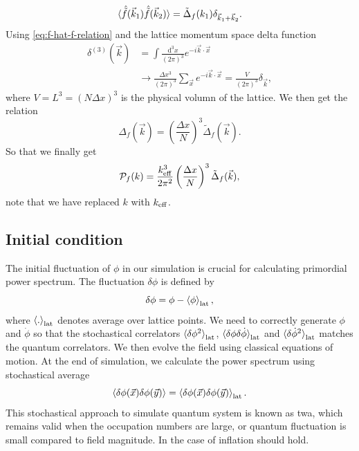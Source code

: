 \documentclass[reprint, 10pt, amsmath, amssymb, floatfix, aps, prd, superscriptaddress, nofootinbib, nobibnotes,twocolumn]{revtex4-1}
\def\dd{{\mathrm{d}}}
\begin{document}
\begin{equation}
	\braket{\hat{\tilde f}(\vec k_1)\hat{\tilde f}(\vec k_2)} = \tilde\Delta_f(k_1)\delta_{\vec k_1 + \vec k_2}.
\end{equation}
Using \eqref{eq:f-hat-f-relation} and the lattice momentum space delta function
\begin{align}
	\delta^{(3)}(\vec k) & = \int\frac{\dd^3x}{(2\pi)^3}e^{-i\vec k\cdot\vec x}\\
	& \to \frac{\Delta x^3}{(2\pi)^3}\sum_{\vec x} e^{-i\vec k\cdot\vec x} = \frac{V}{(2\pi)^3}\delta_{\vec k},
\end{align}
where $V = L^3 = (N\Delta x)^3$ is the physical volumn of the lattice. We then get the relation
\begin{equation}
	\Delta_f(\vec k) = \left(\frac{\Delta x}{N}\right)^3\tilde\Delta_f(\vec k).
\end{equation}
So that we finally get
\begin{equation}\label{eq:lat-spectrum-relation}
	\mathcal P_f(k) = \frac{k_{\rm eff}^3}{2\pi^2}\left(\frac{\Delta x}{N}\right)^3\tilde\Delta_f(\vec k),
\end{equation}
note that we have replaced $k$ with $k_{\rm eff}$.

\subsection{Initial condition}
The initial fluctuation of $\phi$ in our simulation is crucial for calculating primordial power spectrum. The fluctuation $\delta\phi$ is defined by
\begin{equation}
	\delta\phi = \phi - \braket{\phi}_{\rm lat},
\end{equation}
where $\braket{.}_{\rm lat}$ denotes average over lattice points. We need to correctly generate $\phi$ and $\dot\phi$ so that the stochastical correlators $\braket{\delta\phi^2}_{\rm lat}$, $\braket{\delta\phi\delta\dot\phi}_{\rm lat}$ and $\braket{\delta\dot\phi^2}_{\rm lat}$ matches the quantum correlators. We then evolve the field using classical equations of motion. At the end of simulation, we calculate the power spectrum using stochastical average
\begin{equation}
	\braket{\delta\phi(\vec x)\delta\phi(\vec y)} = \braket{\delta\phi(\vec x)\delta\phi(\vec y)}_{\rm lat}.
\end{equation}
This stochastical approach to simulate quantum system is known as \ac{twa}, which remains valid when the occupation numbers are large, or quantum fluctuation is small compared to field magnitude. In the case of inflation should hold.
\end{document}
